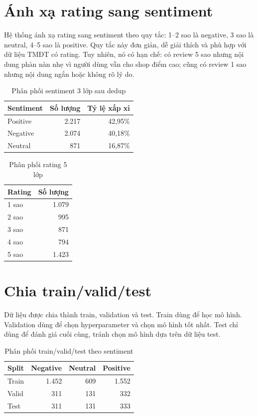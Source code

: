 \section{Ánh xạ rating sang sentiment}
Hệ thống ánh xạ rating sang sentiment theo quy tắc: 1--2 sao là negative, 3 sao là neutral, 4--5 sao là positive. Quy tắc này đơn giản, dễ giải thích và phù hợp với dữ liệu TMĐT có rating. Tuy nhiên, nó có hạn chế: có review 5 sao nhưng nội dung phàn nàn nhẹ vì người dùng vẫn cho shop điểm cao; cũng có review 1 sao nhưng nội dung ngắn hoặc không rõ lý do.
\begin{table}[H]\centering\caption{Phân phối sentiment 3 lớp sau dedup}\label{tab:sentiment-dist}\begin{tabular}{lrr}\toprule Sentiment & Số lượng & Tỷ lệ xấp xỉ \\\midrule Positive & 2.217 & 42,95\% \\ Negative & 2.074 & 40,18\% \\ Neutral & 871 & 16,87\% \\\bottomrule\end{tabular}\end{table}
\begin{table}[H]\centering\caption{Phân phối rating 5 lớp}\label{tab:rating-dist}\begin{tabular}{lr}\toprule Rating & Số lượng \\\midrule 1 sao & 1.079 \\ 2 sao & 995 \\ 3 sao & 871 \\ 4 sao & 794 \\ 5 sao & 1.423 \\\bottomrule\end{tabular}\end{table}

\section{Chia train/valid/test}
Dữ liệu được chia thành train, validation và test. Train dùng để học mô hình. Validation dùng để chọn hyperparameter và chọn mô hình tốt nhất. Test chỉ dùng để đánh giá cuối cùng, tránh chọn mô hình dựa trên dữ liệu test.
\begin{table}[H]\centering\caption{Phân phối train/valid/test theo sentiment}\label{tab:split-dist}\begin{tabular}{lrrr}\toprule Split & Negative & Neutral & Positive \\\midrule Train & 1.452 & 609 & 1.552 \\ Valid & 311 & 131 & 332 \\ Test & 311 & 131 & 333 \\\bottomrule\end{tabular}\end{table}

